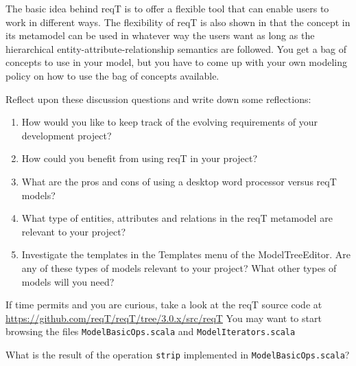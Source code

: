 \documentclass[11pt]{article}
\begin{document}
The basic idea behind reqT is to offer a flexible tool that can enable users to work in different ways. The flexibility of reqT is also shown in that the concept in its metamodel can be used in whatever way the users want as long as the hierarchical entity-attribute-relationship semantics are followed. You get a bag of concepts to use in your model, but you have to come up with your own modeling policy on how to use the bag of concepts available.

\begin{framed}
Reflect upon these discussion questions and write down some reflections:
\begin{enumerate}
\item How would you like to keep track of the evolving requirements of your development project?
\item How could you benefit from using reqT in your project?
\item What are the pros and cons of using a desktop word processor versus reqT models? 
\item What type of entities, attributes and relations in the reqT metamodel are relevant to your project?
\item Investigate the templates in the Templates menu of the ModelTreeEditor. Are any of these types of models relevant to your project? What other types of models will you need?
\end{enumerate}
\end{framed}
{\footnotesize
\noindent If time permits and you are curious, take a look at the reqT source code at \newline\url{https://github.com/reqT/reqT/tree/3.0.x/src/reqT}
\newline\noindent You may want to start browsing the files \verb+ModelBasicOps.scala+ and  \verb+ModelIterators.scala+ 
\begin{framed}
\noindent What is the result of the operation \verb+strip+ implemented in  \verb+ModelBasicOps.scala+?
\end{framed}
}
\end{document}
